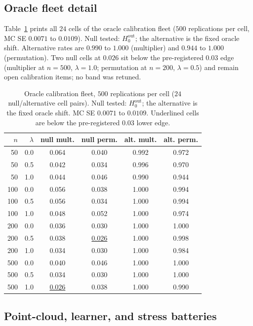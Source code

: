 \subsection{Oracle fleet detail}
\label{app:oracle}

Table~\ref{tab:app-oracle} prints all $24$ cells of the oracle calibration fleet ($500$ replications per cell, MC SE $0.0071$ to $0.0109$). Null tested: $H_0^{\mathrm{out}}$; the alternative is the fixed oracle shift. Alternative rates are $0.990$ to $1.000$ (multiplier) and $0.944$ to $1.000$ (permutation). Two null cells at $0.026$ sit below the pre-registered $0.03$ edge (multiplier at $n=500$, $\lambda=1.0$; permutation at $n=200$, $\lambda=0.5$) and remain open calibration items; no band was retuned.

\begin{table}[t]
\centering
\small
\setlength{\tabcolsep}{5pt}
\begin{tabular}{@{}rrcccc@{}}
\hline
$n$ & $\lambda$ & null mult. & null perm. & alt. mult. & alt. perm. \\
\hline
50 & 0.0 & 0.064 & 0.040 & 0.992 & 0.972 \\
50 & 0.5 & 0.042 & 0.034 & 0.996 & 0.970 \\
50 & 1.0 & 0.044 & 0.046 & 0.990 & 0.944 \\
100 & 0.0 & 0.056 & 0.038 & 1.000 & 0.994 \\
100 & 0.5 & 0.056 & 0.034 & 1.000 & 0.994 \\
100 & 1.0 & 0.048 & 0.052 & 1.000 & 0.974 \\
200 & 0.0 & 0.036 & 0.030 & 1.000 & 1.000 \\
200 & 0.5 & 0.038 & \underline{0.026} & 1.000 & 0.998 \\
200 & 1.0 & 0.034 & 0.030 & 1.000 & 0.984 \\
500 & 0.0 & 0.040 & 0.046 & 1.000 & 1.000 \\
500 & 0.5 & 0.034 & 0.030 & 1.000 & 1.000 \\
500 & 1.0 & \underline{0.026} & 0.038 & 1.000 & 0.990 \\
\hline
\end{tabular}
\caption{Oracle calibration fleet, $500$ replications per cell ($24$ null/alternative cell pairs). Null tested: $H_0^{\mathrm{out}}$; the alternative is the fixed oracle shift. MC SE $0.0071$ to $0.0109$. Underlined cells are below the pre-registered $0.03$ lower edge.}
\label{tab:app-oracle}
\end{table}

\subsection{Point-cloud, learner, and stress batteries}
\label{app:batteries}

